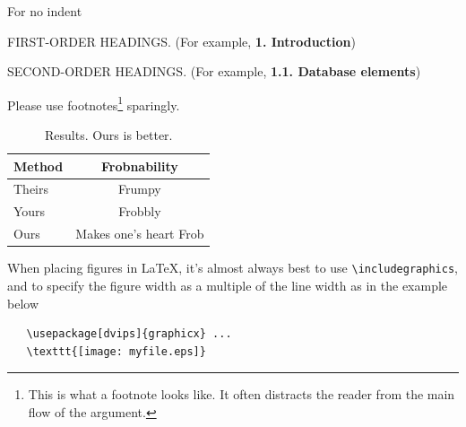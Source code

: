 \documentclass[10pt,twocolumn,letterpaper]{article}
\begin{document}
\noindent For no indent

FIRST-ORDER HEADINGS. (For example, {\large \bf 1. Introduction})

SECOND-ORDER HEADINGS. (For example, { \bf 1.1. Database elements})

Please use footnotes\footnote {This is what a footnote looks like.  It
often distracts the reader from the main flow of the argument.} sparingly.

\begin{table}
  \begin{center}
    \begin{tabular}{|l|c|}
      \hline
      Method & Frobnability \\
      \hline\hline
      Theirs & Frumpy \\
      Yours & Frobbly \\
      Ours & Makes one's heart Frob\\
      \hline
    \end{tabular}
  \end{center}
  \caption{Results.   Ours is better.}
\end{table}

When placing figures in \LaTeX, it's almost always best to use
\verb+\includegraphics+, and to specify the  figure width as a multiple of
the line width as in the example below
{\small\begin{verbatim}
   \usepackage[dvips]{graphicx} ...
   \texttt{[image: myfile.eps]}
\end{verbatim}
}


{\small


}
\end{document}
